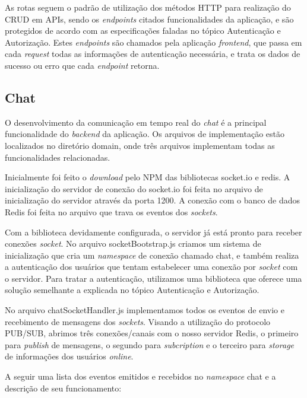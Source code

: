 As rotas seguem o padrão de utilização dos métodos HTTP para realização do CRUD em APIs, sendo os \textit{endpoints} citados funcionalidades da aplicação, e são protegidos de acordo com as especificações faladas no tópico Autenticação e Autorização. Estes \textit{endpoints} são chamados pela aplicação \textit{frontend}, que passa em cada \textit{request} todas as informações de autenticação necessária, e trata os dados de sucesso ou erro que cada \textit{endpoint} retorna.

\subsection{Chat}
O desenvolvimento da comunicação em tempo real do \textit{chat} é a principal funcionalidade do \textit{backend} da aplicação. Os arquivos de implementação estão localizados no diretório domain, onde três arquivos implementam todas as funcionalidades relacionadas.

Inicialmente foi feito o \textit{download} pelo NPM das bibliotecas socket.io e redis. A inicialização do servidor de conexão do socket.io foi feita no arquivo de inicialização do servidor através da porta 1200. A conexão com o banco de dados Redis foi feita no arquivo que trava os eventos dos \textit{sockets}.

Com a biblioteca devidamente configurada, o servidor já está pronto para receber conexões \textit{socket}. No arquivo socketBootstrap.js criamos um sistema de inicialização que cria um \textit{namespace} de conexão chamado chat, e também realiza a autenticação dos usuários que tentam estabelecer uma conexão por \textit{socket} com o servidor. Para tratar a autenticação, utilizamos uma biblioteca \cite{socketio-auth} que oferece uma solução semelhante a explicada no tópico Autenticação e Autorização.

No arquivo chatSocketHandler.js implementamos todos os eventos de envio e recebimento de mensagens dos \textit{sockets}. Visando a utilização do protocolo PUB/SUB, abrimos três conexões/canais com o nosso servidor Redis, o primeiro para \textit{publish} de mensagens, o segundo para \textit{subcription} e o terceiro para \textit{storage} de informações dos usuários \textit{online}.

A seguir uma lista dos eventos emitidos e recebidos no \textit{namespace} chat e a descrição de seu funcionamento:

